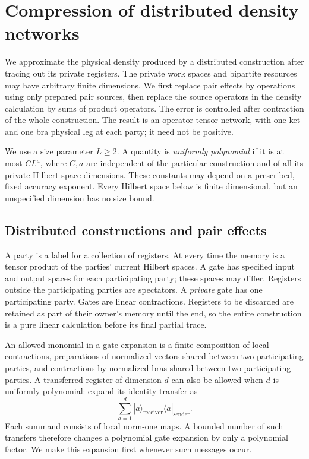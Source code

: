 \documentclass[11pt]{article}
\numberwithin{equation}{section}
\theoremstyle{definition}
\theoremstyle{remark}
\begin{document}
\section{Compression of distributed density networks}
\label{sec:compression}

We approximate the physical density produced by a distributed construction
after tracing out its private registers.  The private work spaces and
bipartite resources may have arbitrary finite dimensions.  We first replace
pair effects by operations using only prepared pair sources, then replace
the source operators in the density calculation by sums of product
operators.  The error is
controlled after contraction of the whole construction.  The result is an
operator tensor network, with one ket and one bra physical leg at each
party; it need not be positive.

We use a size parameter $L\ge2$.  A quantity is \emph{uniformly polynomial}
if it is at most $C L^a$, where $C,a$ are independent of the particular
construction and of all its private Hilbert-space dimensions.  These
constants may depend on a prescribed, fixed accuracy exponent.  Every
Hilbert space below is finite dimensional, but an unspecified dimension
has no size bound.

\subsection{Distributed constructions and pair effects}

A party is a label for a collection of registers.  At every time the
memory is a tensor product of the parties' current Hilbert spaces.  A
gate has specified input and output spaces for each participating party;
these spaces may differ.  Registers outside the participating parties
are spectators.  A \emph{private} gate has one participating party.
Gates are linear contractions.  Registers to be discarded are retained
as part of their owner's memory until the end, so the entire construction
is a pure linear calculation before its final partial trace.

An allowed monomial in a gate expansion is a finite composition of local
contractions, preparations of normalized vectors shared between two
participating parties, and contractions by normalized bras shared
between two participating parties.  A transferred register of dimension
$d$ can also be allowed when $d$ is uniformly polynomial: expand its
identity transfer as
\[
 \sum_{a=1}^{d}|a\rangle_{\mathrm{receiver}}
                 \langle a|_{\mathrm{sender}}.
\]
Each summand consists of local norm-one maps.  A bounded number of such
transfers therefore changes a polynomial gate expansion by only a
polynomial factor.  We make this expansion first whenever such messages
occur.
\end{document}

